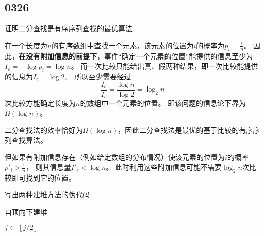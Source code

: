 \documentclass[answers]{exam}
\begin{document}
\begin{questions}
        \newpage %


        \section{0326}\label{sec:0326}

        \question 证明二分查找是有序序列查找的最优算法
        \begin{solution}
            在一个长度为$n$的有序数组中查找一个元素，该元素的位置为$i$的概率为$p_i = \frac{1}{n}$。
            因此，\textbf{在没有附加信息的前提下}，事件“确定一个元素的位置”能提供的信息至少为$I_e = -\log{p_i} = \log n$。
            而一次比较只能给出真、假两种结果，即一次比较能提供的信息为$I_c = \log{2}$。
            所以至少需要经过
            \[\frac{I_e}{I_c} = \frac{ \log{n} }{ \log{2} } = \log_2{n}\]
            次比较方能确定长度为$n$的数组中一个元素的位置。
            即该问题的信息论下界为$\Omega(\log n)$。

            二分查找法的效率恰好为$\Omega(\log n)$，因此二分查找法是最优的基于比较的有序序列查找算法。

            但如果有附加信息存在（例如给定数组的分布情况）使该元素的位置为$i$的概率$p'_i > \frac{1}{n}$，
            则其信息量$I'_e < \log n$。
            此时利用这些附加信息可能不需要$\log_2{n}$次比较即可找到它的位置。

        \end{solution}

        \newpage %

        \question 写出两种建堆方法的伪代码
        \begin{solution}

            \begin{algorithm}[H]
                \caption{自顶向下建堆}
                \begin{algorithmic}[1]
                    \State {}
                    \State $j \gets \left\lfloor j/2 \right\rfloor$
                    \EndWhile
                    \EndFor
                \end{algorithmic}
            \end{algorithm}


\end{solution}
\end{questions}
\end{document}
